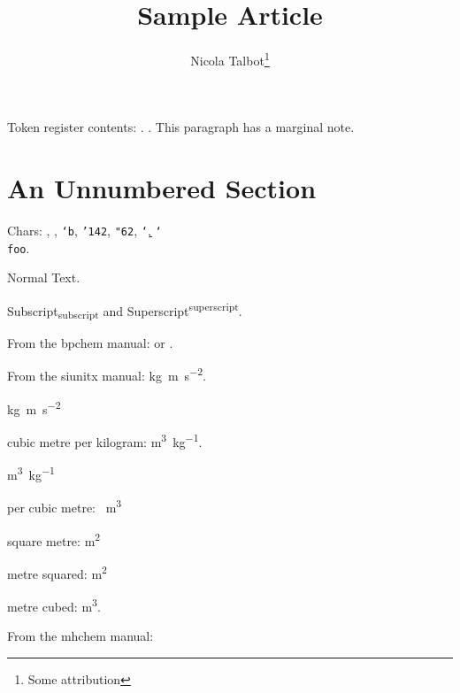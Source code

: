 \documentclass{article}
\title{Sample Article}
\author{Nicola Talbot\thanks{Some attribution}}
\begin{document}
\maketitle

\tableofcontents

\begin{abstract}
\lipsum[1]
\end{abstract}

Token register contents: \the\mytoks.
.
This paragraph has a marginal note.

\section*{An Unnumbered Section}

Chars: , \texttt{}, \texttt{\char`b}, \texttt{\char'142},
\texttt{\char"62}, \texttt{\char`\b}, \texttt{\char`\\ foo}.

Normal Text.
\scalebox{2}{Scaled Text}

\lipsum[4-5]

Subscript\textsubscript{subscript} and
Superscript\textsuperscript{superscript}.

From the bpchem manual:
 or .

\bpalpha \bpbeta \bpDelta
\HNMR \CNMR \cis \trans {}

From the siunitx manual:
\si{\kilo\gram\metre\per\square\second}.

\si{kg.m.s^{-2}}

cubic metre per kilogram:
\si{\cubic\metre\per\kilogram}.

\si{m^{3}.kg^{-1}}

per cubic metre: \si{\per\cubic\metre}

square metre: \si{\square\metre}

metre squared: \si{\metre\squared}

metre cubed: \si{\metre\cubed}.

From the mhchem manual:





\end{document}
